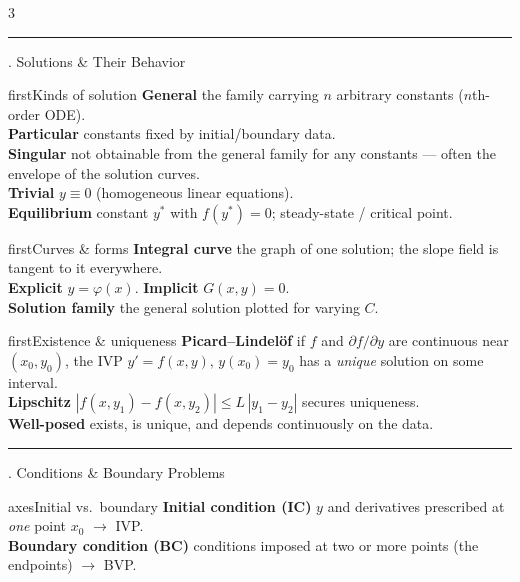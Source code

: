 \documentclass[10pt]{article}
\newcommand{\lab}[1]{\textcolor{ink}{\sffamily\footnotesize\textbf{#1}}\;}
\newcommand{\sect}[2]{%
  \begin{tcolorbox}[blanker, breakable, before skip=2pt, after skip=2pt]
    \begingroup\sffamily\bfseries\normalsize\color{#1}%
    {\color{#1}\rule[-1pt]{3pt}{12pt}}\;#2\endgroup
    \par\vspace{1pt}{\color{#1}\hrule height 1pt}
\end{tcolorbox}}
\begin{document}
\footnotesize\linespread{0.95}\selectfont
\begin{multicols}{3}

  \sect{first}{5.\; Solutions \& Their Behavior}

  \begin{card}{first}{Kinds of solution}
    \lab{General} the family carrying $n$ arbitrary constants ($n$th-order ODE).\\
    \lab{Particular} constants fixed by initial/boundary data.\\
    \lab{Singular} not obtainable from the general family for any constants --- often the envelope of the solution curves.\\
    \lab{Trivial} $y\equiv 0$ (homogeneous linear equations).\\
    \lab{Equilibrium} constant $y^\ast$ with $f(y^\ast)=0$; steady-state / critical point.
  \end{card}

  \begin{card}{first}{Curves \& forms}
    \lab{Integral curve} the graph of one solution; the slope field is tangent to it everywhere.\\
    \lab{Explicit} $y=\varphi(x)$. \quad\lab{Implicit} $G(x,y)=0$.\\
    \lab{Solution family} the general solution plotted for varying $C$.
  \end{card}

  \begin{card}{first}{Existence \& uniqueness}
    \lab{Picard--Lindel\"of} if $f$ and $\partial f/\partial y$ are continuous near $(x_0,y_0)$, the IVP $y'=f(x,y),\,y(x_0)=y_0$ has a \emph{unique} solution on some interval.\\
    \lab{Lipschitz} $|f(x,y_1)-f(x,y_2)|\le L\,|y_1-y_2|$ secures uniqueness.\\
    \lab{Well-posed} exists, is unique, and depends continuously on the data.
  \end{card}

  \sect{axes}{6.\; Conditions \& Boundary Problems}

  \begin{card}{axes}{Initial vs.\ boundary}
    \lab{Initial condition (IC)} $y$ and derivatives prescribed at \emph{one} point $x_0$ $\to$ IVP.\\
    \lab{Boundary condition (BC)} conditions imposed at two or more points (the endpoints) $\to$ BVP.
  \end{card}


\end{multicols}
\end{document}
